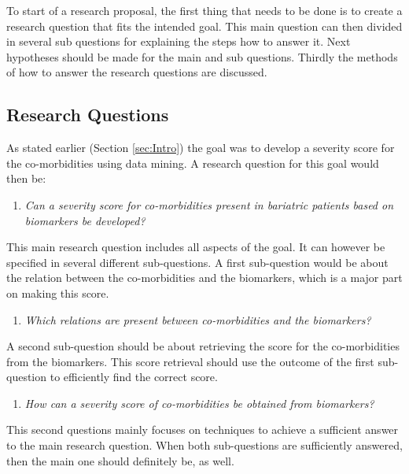 \documentclass[10pt,a4paper]{article}
\begin{document}
	To start of a research proposal, the first thing that needs to be done is to create a research question that fits the intended goal. This main question can then divided in several sub questions for explaining the steps how to answer it. Next hypotheses should be made for the main and sub questions. Thirdly the methods of how to answer the research questions are discussed. 
	
	\subsection{Research Questions}
	
	As stated earlier (Section \ref{sec:Intro}) the goal was to develop a severity score for the co-morbidities using data mining. A research question for this goal would then be:
	
	\begin{enumerate}
		\item[] \emph{Can a severity score for co-morbidities present in bariatric patients based on biomarkers be developed?}
	\end{enumerate}
	
	This main research question includes all aspects of the goal. It can however be specified in several different sub-questions. A first sub-question would be about the relation between the co-morbidities and the biomarkers, which is a major part on making this score.
	
	\begin{enumerate}
		\item \emph{Which relations are present between co-morbidities and the biomarkers?}
	\end{enumerate}
	
	A second sub-question should be about retrieving the score for the co-morbidities from the biomarkers. This score retrieval should use the outcome of the first sub-question to efficiently find the correct score.
	
	\begin{enumerate}[resume]
		\item \emph{How can a severity score of co-morbidities be obtained from biomarkers?}
	\end{enumerate}
	
	This second questions mainly focuses on techniques to achieve a sufficient answer to the main research question. When both sub-questions are sufficiently answered, then the main one should definitely be, as well.
	
\end{document}

